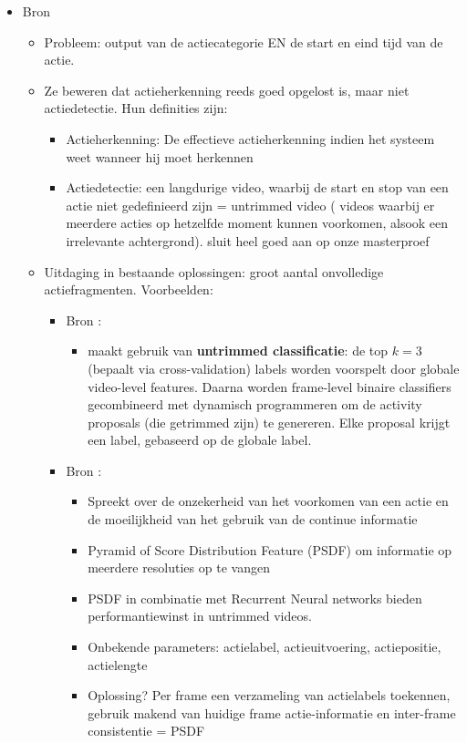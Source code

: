 \begin{itemize}
	\item Bron \cite{Zhao2017}
	\begin{itemize}
		\item Probleem: output van de actiecategorie EN de start en eind tijd van de actie. 
		\item Ze beweren dat actieherkenning reeds goed opgelost is, maar niet actiedetectie. Hun definities zijn: 
		\begin{itemize}
			\item Actieherkenning: De effectieve actieherkenning indien het systeem weet wanneer hij moet herkennen
			\item Actiedetectie: een langdurige video, waarbij de start en stop van een actie niet gedefinieerd zijn = untrimmed video ( videos waarbij er meerdere acties op hetzelfde moment kunnen voorkomen, alsook een irrelevante achtergrond). {\color{green} sluit heel goed aan op onze masterproef}
		\end{itemize}
		\item Uitdaging in bestaande oplossingen: groot aantal onvolledige actiefragmenten. Voorbeelden:
		\begin{itemize}
			\item Bron \cite{Singh2016}:
			\begin{itemize}
				\item maakt gebruik van \textbf{untrimmed classificatie}: de top $k = 3$ (bepaalt via cross-validation) labels worden voorspelt door globale video-level features. Daarna worden frame-level binaire classifiers gecombineerd met dynamisch programmeren om de activity proposals (die getrimmed zijn) te genereren. Elke proposal krijgt een label, gebaseerd op de globale label.
			\end{itemize}
				\item Bron \cite{Yuan2016}:
			\begin{itemize}
				\item Spreekt over de onzekerheid van het voorkomen van een actie en de moeilijkheid van het gebruik van de continue informatie

				\item Pyramid of Score Distribution Feature (PSDF) om informatie op meerdere resoluties op te vangen
				\item PSDF in combinatie met Recurrent Neural networks bieden performantiewinst in untrimmed videos.
				\item Onbekende parameters: actielabel, actieuitvoering, actiepositie, actielengte
				\item Oplossing? Per frame een verzameling van actielabels toekennen, gebruik makend van huidige frame actie-informatie en inter-frame consistentie = PSDF
	

\end{itemize}
\end{itemize}
\end{itemize}
\end{itemize}
